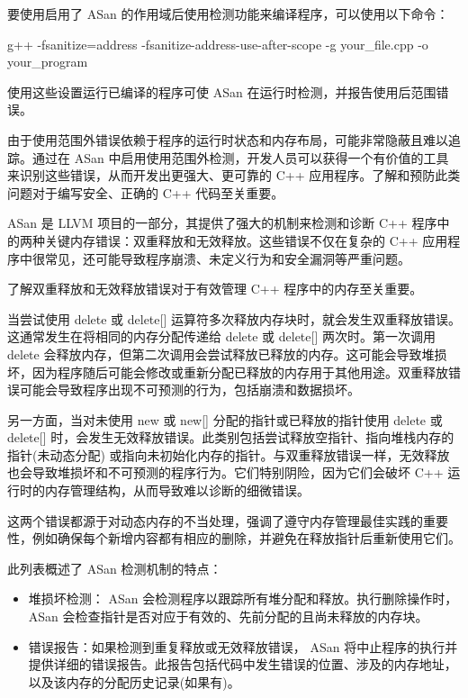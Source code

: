 要使用启用了 ASan 的作用域后使用检测功能来编译程序，可以使用以下命令：

\begin{shell}
g++ -fsanitize=address -fsanitize-address-use-after-scope -g your_file.cpp -o your_program
\end{shell}

使用这些设置运行已编译的程序可使 ASan 在运行时检测，并报告使用后范围错误。

由于使用范围外错误依赖于程序的运行时状态和内存布局，可能非常隐蔽且难以追踪。通过在 ASan 中启用使用范围外检测，开发人员可以获得一个有价值的工具来识别这些错误，从而开发出更强大、更可靠的 C++ 应用程序。了解和预防此类问题对于编写安全、正确的 C++ 代码至关重要。


ASan 是 LLVM 项目的一部分，其提供了强大的机制来检测和诊断 C++ 程序中的两种关键内存错误：双重释放和无效释放。这些错误不仅在复杂的 C++ 应用程序中很常见，还可能导致程序崩溃、未定义行为和安全漏洞等严重问题。


了解双重释放和无效释放错误对于有效管理 C++ 程序中的内存至关重要。

当尝试使用 delete 或 delete[] 运算符多次释放内存块时，就会发生双重释放错误。这通常发生在将相同的内存分配传递给 delete 或 delete[] 两次时。第一次调用 delete 会释放内存，但第二次调用会尝试释放已释放的内存。这可能会导致堆损坏，因为程序随后可能会修改或重新分配已释放的内存用于其他用途。双重释放错误可能会导致程序出现不可预测的行为，包括崩溃和数据损坏。

另一方面，当对未使用 new 或 new[] 分配的指针或已释放的指针使用 delete 或 delete[] 时，会发生无效释放错误。此类别包括尝试释放空指针、指向堆栈内存的指针(未动态分配) 或指向未初始化内存的指针。与双重释放错误一样，无效释放也会导致堆损坏和不可预测的程序行为。它们特别阴险，因为它们会破坏 C++ 运行时的内存管理结构，从而导致难以诊断的细微错误。

这两个错误都源于对动态内存的不当处理，强调了遵守内存管理最佳实践的重要性，例如确保每个新增内容都有相应的删除，并避免在释放指针后重新使用它们。

此列表概述了 ASan 检测机制的特点：

\begin{itemize}
\item
堆损坏检测： ASan 会检测程序以跟踪所有堆分配和释放。执行删除操作时， ASan 会检查指针是否对应于有效的、先前分配的且尚未释放的内存块。

\item
错误报告：如果检测到重复释放或无效释放错误， ASan 将中止程序的执行并提供详细的错误报告。此报告包括代码中发生错误的位置、涉及的内存地址，以及该内存的分配历史记录(如果有)。
\end{itemize}

